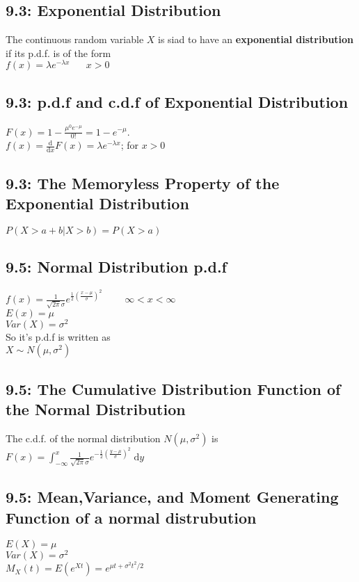 \documentclass[11pt]{article}
\begin{document}
     	\subsection*{9.3: Exponential Distribution}
     		The continuous random variable $X$ is siad to have an {\bf exponential distribution} if its p.d.f. is of the form\\
     		$f(x) = \lambda e^{-\lambda x} \; \;\;\;\;\; x> 0$
     	
     	\subsection*{9.3: p.d.f and c.d.f of Exponential Distribution}
     		$F(x)=1-\frac{\mu^0 e^{-\mu}}{0!} = 1-e^{-\mu}$.\\
     		$f(x)=\frac{\mathrm{d}}{\mathrm{d}x} F(x) = \lambda e^{-\lambda x}$; for $x>0$
     	\subsection*{9.3: The Memoryless Property of the Exponential Distribution}
     	 	$P(X>a+b|X>b)=P(X>a)$
     	 \subsection*{9.5: Normal Distribution p.d.f}
     	 	$f(x)=\frac{1}{\sqrt{2\pi}\sigma}e^{\frac{1}{2}(\frac{x-\mu}{\sigma})^2}\; \; \; \; \; \; \; $                          $\infty < x < \infty$\\
     	 	$E(x) = \mu$\\
     	 	$Var(X) = \sigma^2$\\
     	 	So it's p.d.f is written as\\
     	 	$X \sim N(\mu, \sigma^2)$	
     	 
     	 \subsection*{9.5: The Cumulative Distribution Function of the Normal Distribution}
     	 	The c.d.f. of the normal distribution $N(\mu,\sigma^2)$ is\\
     	 	$F(x)=\int^x_{-\infty} \! \frac{1}{\sqrt{2 \pi }\sigma}e^{-\frac{1}{2}(\frac{y-\mu}{\sigma})^2} \; \mathrm{d}y$
     	 
     	 \subsection*{9.5: Mean,Variance, and Moment Generating Function of a normal distrubution}
     	 	$E(X)=\mu$\\
     	 	$Var(X)=\sigma^2$\\
     	 	$M_X(t) = E(e^{Xt}) = e^{\mu t+\sigma^2t^2/2}$
     	 	
\end{document}
